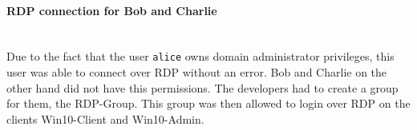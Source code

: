 \paragraph{RDP connection for Bob and Charlie}\ \\
Due to the fact that the user \lstinline|alice| owns domain administrator privileges, this user was able to connect over RDP without an error. Bob and Charlie on the other hand did not have this permissions. The developers had to create a group for them, the RDP-Group. This group was then allowed to login over RDP on the clients Win10-Client and Win10-Admin. 